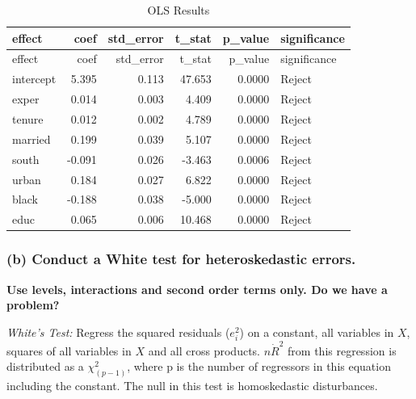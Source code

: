 \documentclass[11pt,]{article}
\newenvironment{Shaded}{\begin{snugshade}}{\end{snugshade}}
\newcommand{\KeywordTok}[1]{\textcolor[rgb]{0.13,0.29,0.53}{\textbf{#1}}}
\newcommand{\DataTypeTok}[1]{\textcolor[rgb]{0.13,0.29,0.53}{#1}}
\newcommand{\DecValTok}[1]{\textcolor[rgb]{0.00,0.00,0.81}{#1}}
\newcommand{\StringTok}[1]{\textcolor[rgb]{0.31,0.60,0.02}{#1}}
\newcommand{\OperatorTok}[1]{\textcolor[rgb]{0.81,0.36,0.00}{\textbf{#1}}}
\newcommand{\NormalTok}[1]{#1}
\begin{document}
\newpage

\begin{Shaded}
\end{Shaded}

\begin{longtable}[]{@{}lrrrrl@{}}
\caption{OLS Results}\tabularnewline
\toprule
effect & coef & std\_error & t\_stat & p\_value &
significance\tabularnewline
\midrule
\endfirsthead
\toprule
effect & coef & std\_error & t\_stat & p\_value &
significance\tabularnewline
\midrule
\endhead
intercept & 5.395 & 0.113 & 47.653 & 0.0000 & Reject\tabularnewline
exper & 0.014 & 0.003 & 4.409 & 0.0000 & Reject\tabularnewline
tenure & 0.012 & 0.002 & 4.789 & 0.0000 & Reject\tabularnewline
married & 0.199 & 0.039 & 5.107 & 0.0000 & Reject\tabularnewline
south & -0.091 & 0.026 & -3.463 & 0.0006 & Reject\tabularnewline
urban & 0.184 & 0.027 & 6.822 & 0.0000 & Reject\tabularnewline
black & -0.188 & 0.038 & -5.000 & 0.0000 & Reject\tabularnewline
educ & 0.065 & 0.006 & 10.468 & 0.0000 & Reject\tabularnewline
\bottomrule
\end{longtable}

\subsubsection{(b) Conduct a White test for heteroskedastic
errors.}\label{b-conduct-a-white-test-for-heteroskedastic-errors.}

\textbf{Use levels, interactions and second order terms only. Do we have
a problem?}

\emph{White's Test:} Regress the squared residuals (\(e^2_i\)) on a
constant, all variables in \emph{\(X\)}, squares of all variables in
\emph{\(X\)} and all cross products. \(n \dot R^2\) from this regression
is distributed as a \(\chi^2_{(p-1)}\), where p is the number of
regressors in this equation including the constant. The null in this
test is homoskedastic disturbances.
\end{document}
